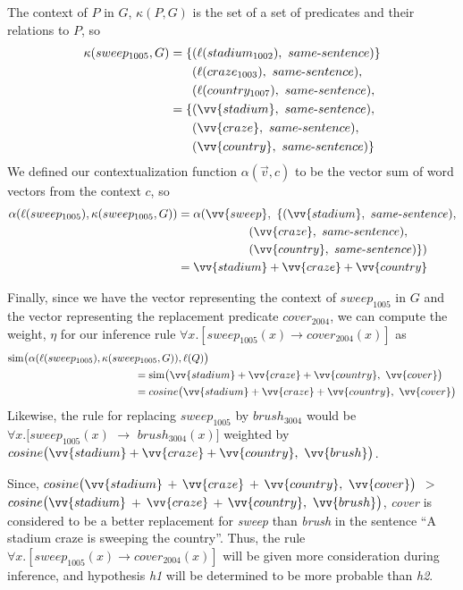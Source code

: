 The context of $P$ in $G$, $\kappa(P,G)$ is the set of a set of
predicates and their relations to $P$, so
\begin{align*}
\kappa(sweep_{1005}, G) 
= \{ & (\ell(\pred{stadium}{1002}),~same\text{-}sentence) \} \\
     & (\ell(\pred{craze}{1003}),~same\text{-}sentence), \\ 
     & (\ell(\pred{country}{1007}),~same\text{-}sentence), \\ 
= \{ & (\vv{stadium},~same\text{-}sentence), \\
     & (\vv{craze},~same\text{-}sentence), \\
     & (\vv{country},~same\text{-}sentence) \}
\end{align*}
We defined our contextualization function $\alpha(\vec v, c)$ to be the vector
sum of word vectors from the context $c$, so
\begin{align*}
\alpha(\ell(sweep_{1005}), \kappa(sweep_{1005}, G))
& = \alpha(\vv{sweep},~ \{ 
                (\vv{stadium},~same\text{-}sentence), \\
& \hspace{60px} (\vv{craze},~same\text{-}sentence), \\
& \hspace{60px} (\vv{country},~same\text{-}sentence) \}) \\
& = \vv{stadium} + \vv{craze} + \vv{country}
\end{align*}

Finally, since we have the vector representing the context of $sweep_{1005}$ in
$G$ and the vector representing the replacement predicate $cover_{2004}$, we can
compute the weight, $\eta$ for our inference rule $\forall x.[sweep_{1005}(x)
\to cover_{2004}(x)]$ as
\begin{align*}
& \simfunc\big(\alpha(\ell(sweep_{1005}), \kappa(sweep_{1005}, G)), \ell(Q)\big) \\
& \hspace{120px} = \simfunc\big(\vv{stadium} + \vv{craze} + \vv{country},~ \vv{cover}\big) \\
& \hspace{120px} = cosine\big(\vv{stadium} + \vv{craze} + \vv{country},~ \vv{cover}\big)
\end{align*}
Likewise, the rule for replacing $sweep_{1005}$ by $brush_{3004}$ would be 
$\forall x.[sweep_{1005}(x)$ $\to$ $brush_{3004}(x)]$ weighted by 
$cosine\big(\vv{stadium} + \vv{craze} + \vv{country},~ \vv{brush}\big)$.

Since, $cosine\big(\vv{stadium}$ $+$ $\vv{craze}$ $+$ $\vv{country},~
\vv{cover}\big)$ $>$ $cosine\big(\vv{stadium}$ $+$ $\vv{craze}$ $+$ $\vv{country},~
\vv{brush}\big)$, {\it cover} is considered to be a better replacement for {\it
sweep} than {\it brush} in the sentence ``A stadium craze is sweeping the
country''.  Thus, the rule $\forall x.[sweep_{1005}(x) \to cover_{2004}(x)]$
will be given more consideration during inference, and hypothesis {\it h1} will
be determined to be more probable than {\it h2}.




